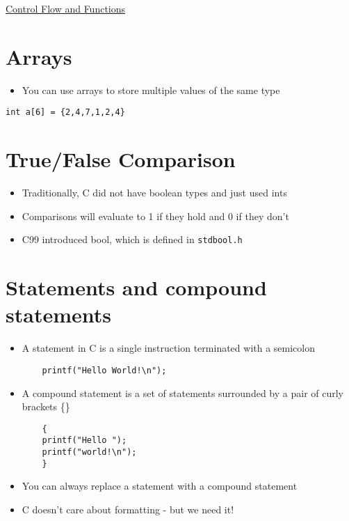 \documentclass{article}[18pt]
\begin{document}
\begin{center}
\underline{\huge Control Flow and Functions}
\end{center}
\section{Arrays}
\begin{itemize}
	\item You can use arrays to store multiple values of the same type
\end{itemize}
\begin{verbatim}
int a[6] = {2,4,7,1,2,4}
\end{verbatim}
\section{True/False Comparison}
\begin{itemize}
	\item Traditionally, C did not have boolean types and just used ints
	\item Comparisons will evaluate to 1 if they hold and 0 if they don't
	\item C99 introduced bool, which is defined in \texttt{stdbool.h}
\end{itemize}
\section{Statements and compound statements}
\begin{itemize}
	\item A statement in C is a single instruction terminated with a semicolon
	\begin{verbatim}
	printf("Hello World!\n");
	\end{verbatim}
	\item A compound statement is a set of statements surrounded by a pair of curly brackets \{\}
	\begin{verbatim}
	{
	printf("Hello ");
	printf("world!\n");
	}
	\end{verbatim}
	\item You can always replace a statement with a compound statement
	\item C doesn't care about formatting - but we need it!
\end{itemize}
\end{document}
